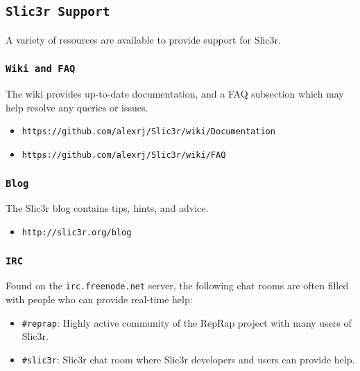 \subsection{\texttt{Slic3r Support}} %
\label{sec:slic3r_support}


A variety of resources are available to provide support for Slic3r.
\subsubsection{\texttt{Wiki and FAQ}} %
\label{sub:wiki_and_faq}
The wiki provides up-to-date documentation, and a FAQ subsection which may help resolve any queries or issues.
\begin{itemize}
    \item \texttt{https://github.com/alexrj/Slic3r/wiki/Documentation}
    \item \texttt{https://github.com/alexrj/Slic3r/wiki/FAQ}
\end{itemize}

\subsubsection{\texttt{Blog}} %
\label{sub:blog}
The Slic3r blog contains tips, hints, and advice.
\begin{itemize}
    \item \texttt{http://slic3r.org/blog}
\end{itemize}

\subsubsection{\texttt{IRC}} %
\label{sub:irc}

Found on the \texttt{irc.freenode.net} server, the following chat rooms are often filled with people who can provide real-time help:
\begin{itemize}
\item \texttt{\#reprap}: Highly active community of the RepRap project with many users of Slic3r.
\item \texttt{\#slic3r}: Slic3r chat room where Slic3r developers and users can provide help.
\end{itemize}

